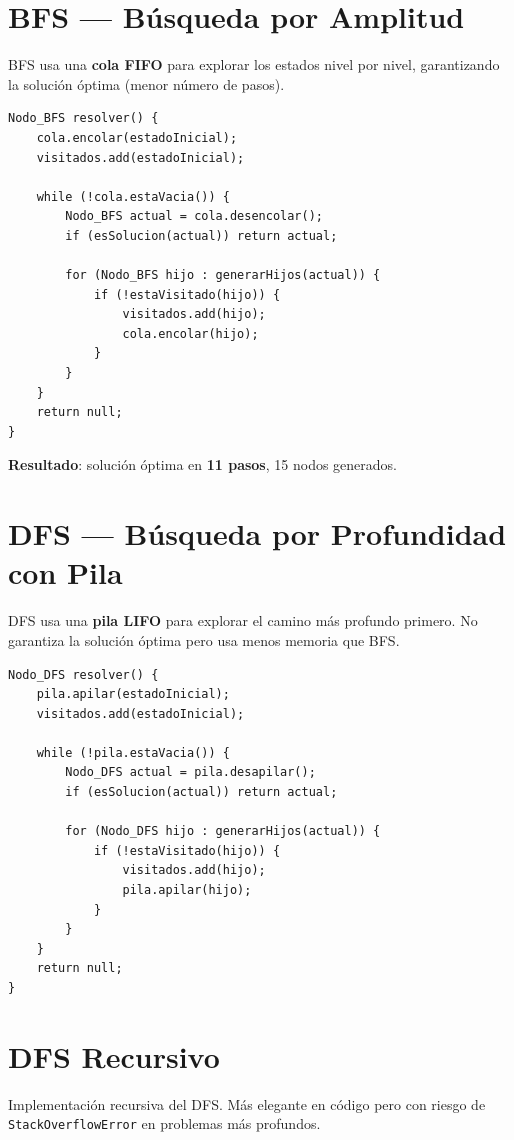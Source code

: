 \documentclass[12pt,a4paper]{article}
\begin{document}
\section{BFS --- Búsqueda por Amplitud}

BFS usa una \textbf{cola FIFO} para explorar los estados nivel por nivel, garantizando la solución óptima (menor número de pasos).

\begin{lstlisting}
Nodo_BFS resolver() {
    cola.encolar(estadoInicial);
    visitados.add(estadoInicial);

    while (!cola.estaVacia()) {
        Nodo_BFS actual = cola.desencolar();
        if (esSolucion(actual)) return actual;

        for (Nodo_BFS hijo : generarHijos(actual)) {
            if (!estaVisitado(hijo)) {
                visitados.add(hijo);
                cola.encolar(hijo);
            }
        }
    }
    return null;
}
\end{lstlisting}

\textbf{Resultado}: solución óptima en \textbf{11 pasos}, 15 nodos generados.

\section{DFS --- Búsqueda por Profundidad con Pila}

DFS usa una \textbf{pila LIFO} para explorar el camino más profundo primero. No garantiza la solución óptima pero usa menos memoria que BFS.

\begin{lstlisting}
Nodo_DFS resolver() {
    pila.apilar(estadoInicial);
    visitados.add(estadoInicial);

    while (!pila.estaVacia()) {
        Nodo_DFS actual = pila.desapilar();
        if (esSolucion(actual)) return actual;

        for (Nodo_DFS hijo : generarHijos(actual)) {
            if (!estaVisitado(hijo)) {
                visitados.add(hijo);
                pila.apilar(hijo);
            }
        }
    }
    return null;
}
\end{lstlisting}

\section{DFS Recursivo}

Implementación recursiva del DFS. Más elegante en código pero con riesgo de \texttt{StackOverflowError} en problemas más profundos.
\end{document}
